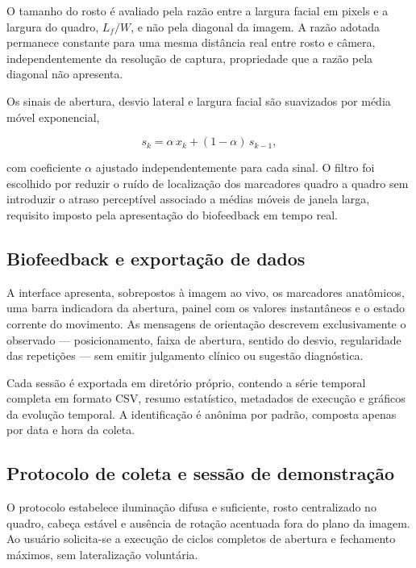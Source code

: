 \documentclass[
    article,
    11pt,
    oneside,
    a4paper,
    english,
    brazil
]{abntex2}
\begin{document}
O tamanho do rosto é avaliado pela razão entre a largura facial em pixels e
a largura do quadro, $L_{f}/W$, e não pela diagonal da imagem. A razão
adotada permanece constante para uma mesma distância real entre rosto e
câmera, independentemente da resolução de captura, propriedade que a razão
pela diagonal não apresenta.

Os sinais de abertura, desvio lateral e largura facial são suavizados por
média móvel exponencial,

\begin{equation}
    s_{k} = \alpha \, x_{k} + (1 - \alpha)\, s_{k-1} ,
    \label{eq:ema}
\end{equation}

\noindent
com coeficiente $\alpha$ ajustado independentemente para cada sinal. O filtro
foi escolhido por reduzir o ruído de localização dos marcadores quadro a
quadro sem introduzir o atraso perceptível associado a médias móveis de
janela larga, requisito imposto pela apresentação do biofeedback em tempo
real.

\subsection{Biofeedback e exportação de dados}

A interface apresenta, sobrepostos à imagem ao vivo, os marcadores
anatômicos, uma barra indicadora da abertura, painel com os valores
instantâneos e o estado corrente do movimento. As mensagens de orientação
descrevem exclusivamente o observado --- posicionamento, faixa de abertura,
sentido do desvio, regularidade das repetições --- sem emitir julgamento
clínico ou sugestão diagnóstica.

Cada sessão é exportada em diretório próprio, contendo a série temporal
completa em formato CSV, resumo estatístico, metadados de execução e
gráficos da evolução temporal. A identificação é anônima por padrão,
composta apenas por data e hora da coleta.

\subsection{Protocolo de coleta e sessão de demonstração}

O protocolo estabelece iluminação difusa e suficiente, rosto centralizado no
quadro, cabeça estável e ausência de rotação acentuada fora do plano da
imagem. Ao usuário solicita-se a execução de ciclos completos de abertura e
fechamento máximos, sem lateralização voluntária.
\end{document}
